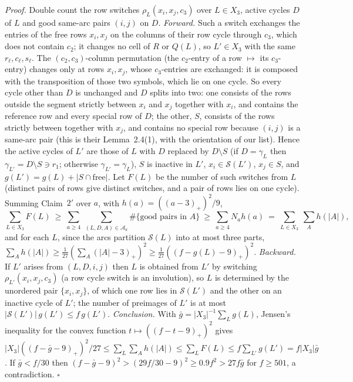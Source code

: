 \documentclass[11pt]{article}
\theoremstyle{definition}
\begin{document}
\emph{Proof.}  Double count the row switches $\rho_L(x_i,x_j,c_3)$ over $L\in X_3$, active
cycles $D$ of $L$ and good same-arc pairs $(i,j)$ on $D$.  \emph{Forward.}  Such a switch
exchanges the entries of the free rows $x_i,x_j$ on the columns of their row cycle through
$c_3$, which does not contain $c_2$; it changes no cell of $R$ or $Q(L)$, so $L'\in X_3$
with the same $r_\ell,c_\ell,s_\ell$.  The $(c_2,c_3)$-column permutation (the $c_2$-entry
of a row $\mapsto$ its $c_3$-entry) changes only at rows $x_i,x_j$, whose $c_3$-entries are
exchanged: it is composed with the transposition of those two symbols, which lie on one
cycle.  So every cycle other than $D$ is unchanged and $D$ splits into two: one consists
of the rows outside the segment strictly between $x_i$ and $x_j$ together with $x_i$, and
contains the reference row and every special row of $D$; the other, $S$, consists of the
rows strictly between together with $x_j$, and contains no special row because $(i,j)$ is
a same-arc pair (this is their Lemma~2.4(1), with the orientation of our list).  Hence the
active cycles of $L'$ are those of $L$ with $D$ replaced by $D\setminus S$ (if $D=\gamma_L$
then $\gamma_{L'}=D\setminus S\ni r_1$; otherwise $\gamma_{L'}=\gamma_L$), $S$ is inactive in
$L'$, $x_i\in\mathcal S(L')$, $x_j\in S$, and $g(L')=g(L)+|S\cap\text{free}|$.  Let $F(L)$
be the number of such switches from $L$ (distinct pairs of rows give distinct switches,
and a pair of rows lies on one cycle).  Summing Claim~$2'$ over $a$, with
$h(a)=((a-3)_+)^2/9$,
\[
\sum_{L\in X_3}F(L)\ \ge\ \sum_{a\ge4}\ \sum_{(L,D,A)\in\mathcal A_a}\#\{\text{good pairs in }A\}
\ \ge\ \sum_{a\ge4}N_ah(a)\ =\ \sum_{L\in X_3}\ \sum_{A}h(|A|),
\]
and for each $L$, since the arcs partition $\mathcal S(L)$ into at most three parts,
$\sum_Ah(|A|)\ge\frac1{27}(\sum_A(|A|-3)_+)^2\ge\frac1{27}((f-g(L)-9)_+)^2$.
\emph{Backward.}  If $L'$ arises from $(L,D,i,j)$ then $L$ is obtained from $L'$ by
switching $\rho_{L'}(x_i,x_j,c_3)$ (a row cycle switch is an involution), so $L$ is
determined by the unordered pair $\{x_i,x_j\}$, of which one row lies in $\mathcal S(L')$
and the other on an inactive cycle of $L'$; the number of preimages of $L'$ is at most
$|\mathcal S(L')|\,g(L')\le f\,g(L')$.  \emph{Conclusion.}  With
$\bar g=|X_3|^{-1}\sum_Lg(L)$, Jensen's inequality for the convex function
$t\mapsto((f-t-9)_+)^2$ gives
$|X_3|((f-\bar g-9)_+)^2/27\le\sum_L\sum_Ah(|A|)\le\sum_LF(L)\le f\sum_{L'}g(L')=f|X_3|\bar g$.
If $\bar g<f/30$ then $(f-\bar g-9)^2>(29f/30-9)^2\ge0.9f^2>27f\bar g$ for $f\ge501$, a
contradiction.  $\square$
\end{document}
